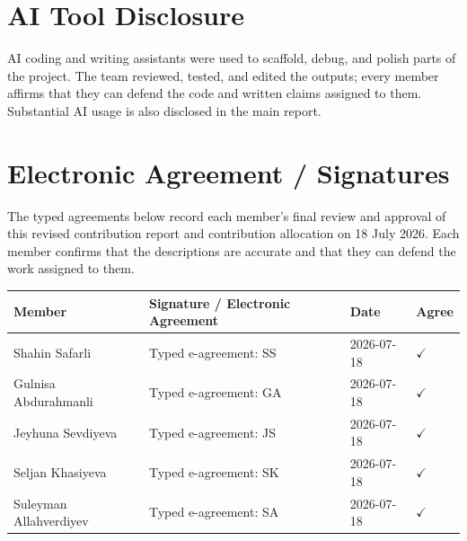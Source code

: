 \documentclass[10pt,a4paper,landscape]{article}
\begin{document}
\section*{AI Tool Disclosure}
AI coding and writing assistants were used to scaffold, debug, and polish parts of the project. The team reviewed, tested, and edited the outputs; every member affirms that they can defend the code and written claims assigned to them. Substantial AI usage is also disclosed in the main report.

\section*{Electronic Agreement / Signatures}
The typed agreements below record each member's final review and approval of
this revised contribution report and contribution allocation on 18 July 2026.
Each member confirms that the descriptions are accurate and that they can
defend the work assigned to them.

\begin{center}
\begin{tabular}{p{4.0cm}p{5.0cm}p{2.5cm}p{2.0cm}}
\toprule
\textbf{Member} & \textbf{Signature / Electronic Agreement} & \textbf{Date} & \textbf{Agree} \\
\midrule
Shahin Safarli & Typed e-agreement: SS & 2026-07-18 & $\checkmark$ \\
Gulnisa Abdurahmanli & Typed e-agreement: GA & 2026-07-18 & $\checkmark$ \\
Jeyhuna Sevdiyeva & Typed e-agreement: JS & 2026-07-18 & $\checkmark$ \\
Seljan Khasiyeva & Typed e-agreement: SK & 2026-07-18 & $\checkmark$ \\
Suleyman Allahverdiyev & Typed e-agreement: SA & 2026-07-18 & $\checkmark$ \\
\bottomrule
\end{tabular}
\end{center}
\end{document}
